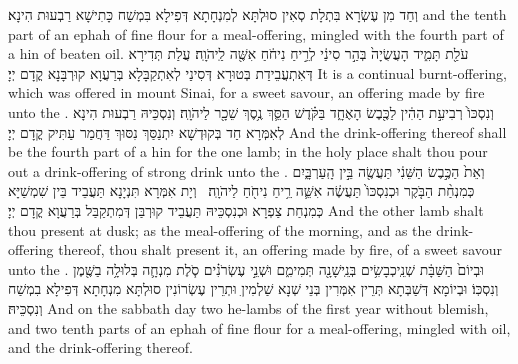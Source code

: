 {וְחַד מִן עֶשְׂרָא בִּתְלָת סְאִין סוּלְתָּא לְמִנְחָתָא דְּפִילָא בִּמְשַׁח כָּתִישָׁא רַבְעוּת הִינָא׃}
{and the tenth part of an ephah of fine flour for a meal-offering, mingled with the fourth part of a hin of beaten oil.}{}
{עֹלַ֖ת תָּמִ֑יד הָעֲשֻׂיָה֙ בְּהַ֣ר סִינַ֔י לְרֵ֣יחַ נִיחֹ֔חַ אִשֶּׁ֖ה לַֽיהֹוָֽה׃}
{עֲלַת תְּדִירָא דְּאִתְעֲבֵידַת בְּטוּרָא דְּסִינַי לְאִתְקַבָּלָא בְּרַעֲוָא קוּרְבָּנָא קֳדָם יְיָ׃}
{It is a continual burnt-offering, which was offered in mount Sinai, for a sweet savour, an offering made by fire unto the \lord.}{}
{וְנִסְכּוֹ֙ רְבִיעִ֣ת הַהִ֔ין לַכֶּ֖בֶשׂ הָאֶחָ֑ד בַּקֹּ֗דֶשׁ הַסֵּ֛ךְ נֶ֥סֶךְ שֵׁכָ֖ר לַיהֹוָֽה׃}
{וְנִסְכֵּיהּ רַבְעוּת הִינָא לְאִמְּרָא חַד בְּקוּדְשָׁא יִתְנַסַּךְ נִסּוּךְ דַּחֲמַר עַתִּיק קֳדָם יְיָ׃}
{And the drink-offering thereof shall be the fourth part of a hin for the one lamb; in the holy place shalt thou pour out a drink-offering of strong drink unto the \lord.}{}
{וְאֵת֙ הַכֶּ֣בֶשׂ הַשֵּׁנִ֔י תַּעֲשֶׂ֖ה בֵּ֣ין הָֽעַרְבָּ֑יִם כְּמִנְחַ֨ת הַבֹּ֤קֶר וּכְנִסְכּוֹ֙ תַּעֲשֶׂ֔ה אִשֵּׁ֛ה רֵ֥יחַ נִיחֹ֖חַ לַיהֹוָֽה׃ \petucha }
{וְיָת אִמְּרָא תִּנְיָנָא תַּעֲבֵיד בֵּין שִׁמְשַׁיָּא כְּמִנְחַת צַפְרָא וּכְנִסְכֵּיהּ תַּעֲבֵיד קוּרְבַּן דְּמִתְקַבַּל בְּרַעֲוָא קֳדָם יְיָ׃}
{And the other lamb shalt thou present at dusk; as the meal-offering of the morning, and as the drink-offering thereof, thou shalt present it, an offering made by fire, of a sweet savour unto the \lord.}{}
\label{maft_ShabRCh}
{וּבְיוֹם֙ הַשַּׁבָּ֔ת שְׁנֵֽי\maqqaf כְבָשִׂ֥ים בְּנֵֽי\maqqaf שָׁנָ֖ה תְּמִימִ֑ם וּשְׁנֵ֣י עֶשְׂרֹנִ֗ים סֹ֧לֶת מִנְחָ֛ה בְּלוּלָ֥ה בַשֶּׁ֖מֶן וְנִסְכּֽוֹ׃}
{וּבְיוֹמָא דְּשַׁבְּתָא תְּרֵין אִמְּרִין בְּנֵי שְׁנָא שַׁלְמִיןִ וּתְרֵין עֶשְׂרוֹנִין סוּלְתָּא מִנְחָתָא דְּפִילָא בִמְשַׁח וְנִסְכֵּיהּ׃}
{And on the sabbath day two he-lambs of the first year without blemish, and two tenth parts of an ephah of fine flour for a meal-offering, mingled with oil, and the drink-offering thereof.}{}
